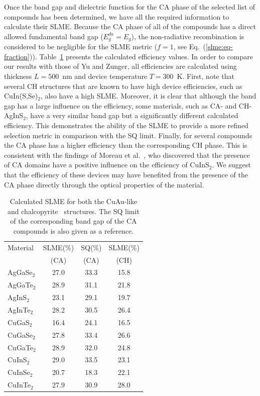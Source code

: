 \begin{refsection}
Once the band gap and dielectric function for the CA phase of 
the selected list of compounds has been determined, we have all the required information to 
calculate their SLME. Because the CA phase of all of the compounds has a direct 
allowed fundamental band gap ($E_g^{da}=E_g$), the non-radiative recombination 
is considered to be negligible for the SLME metric ($f = 1$, see 
Eq.~(\ref{slme:eq-fraction})). Table~\ref{slme:tab-SLME} presents the 
calculated efficiency values.
In order to compare our results with those of Yu 
and Zunger, all efficiencies are calculated using thickness $L = 
500$~\si{\nano\meter} and device temperature \mbox{$T = 300$~\si{\kelvin}}. 
First, note that several CH structures that are known to have high device 
efficiencies, such as CuIn(S,Se)$_{2}$, also have a high SLME. Moreover, it is 
clear that although the band gap has a large influence on the efficiency, some 
materials, such as CA- and \mbox{CH-AgInS$_2$}, have a very similar band gap 
but a significantly different calculated efficiency. This demonstrates the 
ability of the SLME to provide a more refined selection metric in comparison 
with the SQ limit. Finally, for several compounds the CA phase 
has a higher efficiency than the corresponding CH phase. This is consistent 
with the findings of Moreau et al.~\cite{Moreau2015}, who discovered that the 
presence of CA domains have a positive influence on the efficiency of 
CuInS$_2$. We suggest that the efficiency of these devices may have benefited 
from the presence of the CA phase directly through the optical properties of 
the material. 

\begin{table}
\centering \vspace*{-1em}
\captionsetup{width=0.45\textwidth}
\renewcommand{\arraystretch}{1.2} 
\caption{Calculated SLME for both the \mbox{CuAu-like} and 
chalcopyrite~\cite{Yu2012} structures. The SQ limit of the corresponding band 
gap of the CA compounds is also given as a reference.} 
\label{slme:tab-SLME} 
\begin{tabular}{l@{\hskip 1.5em}c@{\hskip 0.8em}c@{\hskip0.8em}c} 
\hline 
Material & SLME(\%) & SQ(\%) & SLME(\%)\\ 
		 &  (CA)	&  (CA) &  (CH)	 \\\hline 
AgGaSe$_2$ & 27.0 & 33.3 & 15.8 \\ 
AgGaTe$_2$ & 28.9 & 31.1 & 21.8 \\ 
AgInS$_2$  & 23.1 & 29.1 & 19.7 \\ 
AgInTe$_2$ & 28.2 & 30.5 & 26.4 \\ 
CuGaS$_2$  & 16.4 & 24.1 & 16.5 \\ 
CuGaSe$_2$ & 27.8 & 33.4 & 26.6 \\ 
CuGaTe$_2$ & 28.9 & 32.0 & 24.8 \\ 
CuInS$_2$  & 29.0 & 33.5 & 23.1 \\ 
CuInSe$_2$ & 20.7 & 18.3 & 22.1 \\ 
CuInTe$_2$ & 27.9 & 30.9 & 28.0 \\ \hline 
\end{tabular} 
\end{table}


\end{refsection}
